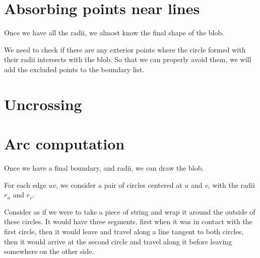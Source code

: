 \documentclass[paper=a4, fontsize=11pt]{scrartcl} %
\numberwithin{equation}{section} %
\numberwithin{figure}{section} %
\numberwithin{table}{section} %
\begin{document}
\section{Absorbing points near lines}
Once we have all the radii, we almost know the final shape of the blob.

We need to check if there are any exterior points where the circle
formed with their radii intersects with the blob.
So that we can properly avoid them, we will add the excluded points to
the boundary list.



\section{Uncrossing}

\section{Arc computation}
Once we have a final boundary, and radii, we can draw the blob.

For each edge $uv$, we consider a pair of circles centered at
$u$ and $v$, with the radii $r_u$ and $r_v$.

Consider as if we were to take a piece of string and wrap it around
the outside of these circles.
It would have three segments,
first when it was in contact with the first circle,
then it would leave and travel along a line tangent to both circles,
then it would arrive at the second circle
and travel along it before leaving somewhere on the other side.




\end{document}

